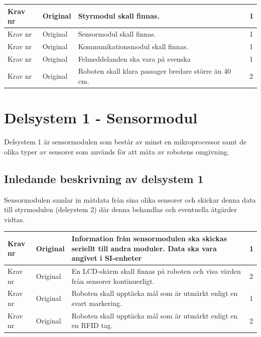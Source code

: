 \documentclass[11pt]{article}
\newcounter{kravc}
\newcommand{\kravcc}{
	\thekravc
	\stepcounter{kravc}
}
\begin{document}
\begin{flushleft}
\begin{center}
\begin{longtable}{|l|l|p{.70\linewidth}|l|}
Krav nr\kravcc &
Original &
Styrmodul skall finnas. &
1 \\ \hline

Krav nr\kravcc &
Original &
Sensormodul skall finnas. &
1 \\ \hline

Krav nr\kravcc &
Original &
Kommunikationsmodul skall finnas. &
1 \\ \hline

Krav nr\kravcc &
Original &
Felmeddelanden ska vara på svenska &
1 \\ \hline

Krav nr\kravcc &
Original &
Roboten skall klara passager bredare större än 40 cm. &
2 \\ \hline
\end{longtable}
\end{center}

\pagebreak

\section{Delsystem 1 - Sensormodul}
Delsystem 1 är sensormodulen som består av minst en mikroprocessor samt de olika typer av sensorer som används för att mäta av robotens omgivning.


\subsection{Inledande beskrivning av delsystem 1}
Sensormodulen samlar in mätdata från sina olika sensorer och skickar denna data till styrmodulen (delsystem 2) där denna behandlas och eventuella åtgärder vidtas.

\begin{center}
\begin{longtable}{|l|l|p{.70\linewidth}|l|} \hline

Krav nr\kravcc & 
Original &
Information från sensormodulen ska skickas seriellt till andra moduler. Data ska vara angivet i SI-enheter &
1 \\ \hline

Krav nr\kravcc &
Original &
En LCD-skärm skall finnas på roboten och visa värden från sensorer kontinuerligt. &
2 \\ \hline

Krav nr\kravcc &
Original &
Roboten skall upptäcka mål som är utmärkt enligt en svart markering. &
1 \\ \hline

Krav nr\kravcc &
Original &
Roboten skall upptäcka mål som är utmärkt enligt en en RFID tag.&
2 \\ \hline


\end{longtable}
\end{center}
\end{flushleft}
\end{document}
